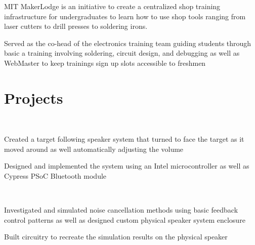 \documentclass[letterpaper, article]{deedy-resume-openfont}
\begin{document}
\begin{minipage}[t]{0.66\textwidth}

\begin{tightemize}
	\item MIT MakerLodge is an initiative to create a centralized shop training infrastructure for undergraduates to learn how to use shop tools ranging from laser cutters to drill presses to soldering irons. 
	\item Served as the co-head of the electronics training team guiding students through basic a training involving soldering, circuit design, and debugging as well as WebMaster to keep trainings sign up slots accessible to freshmen
\end{tightemize}


\section{Projects}

\\
\begin{tightemize}
	\item Created a target following speaker system that turned to face the target as it moved around as well automatically adjusting the volume
	\item Designed and implemented the system using an Intel microcontroller as well as Cypress PSoC Bluetooth module
\end{tightemize}

\\
\begin{tightemize}
	\item Investigated and simulated noise cancellation methods using basic feedback control patterns as well as designed custom physical speaker system enclosure
	\item Built circuitry to recreate the simulation results on the physical speaker 
\end{tightemize}


\end{minipage}
\end{document}
